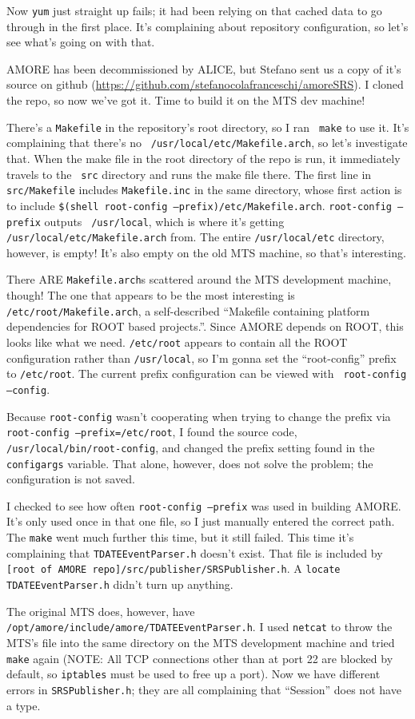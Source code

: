\documentclass[12pt]{article}
\begin{document}
\qq Now {\tt yum} just straight up fails; it had been relying on that cached
data to go through in the first place. It's complaining about repository
configuration, so let's see what's going on with that.

\qq AMORE has been decommissioned by ALICE, but Stefano sent us a copy of it's
source on github (\url{https://github.com/stefanocolafranceschi/amoreSRS}). I
cloned the repo, so now we've got it. Time to build it on the MTS dev machine!

\qq There's a {\tt Makefile} in the repository's root directory, so I ran {\tt
  make} to use it. It's complaining that there's no {\tt
  /usr/local/etc/Makefile.arch}, so let's investigate that. When the make file
in the root directory of the repo is run, it immediately travels to the {\tt
  src} directory and runs the make file there. The first line in {\tt
  src/Makefile} includes {\tt Makefile.inc} in the same directory, whose first
action is to include {\tt \$(shell root-config
  --prefix)/etc/Makefile.arch}. {\tt root-config --prefix} outputs {\tt
  /usr/local}, which is where it's getting {\tt /usr/local/etc/Makefile.arch}
from. The entire {\tt /usr/local/etc} directory, however, is empty! It's also
empty on the old MTS machine, so that's interesting. 

\qq There ARE {\tt Makefile.arch}s scattered around the MTS development machine,
though! The one that appears to be the most interesting is {\tt
  /etc/root/Makefile.arch}, a self-described ``Makefile containing platform
dependencies for ROOT based projects.''. Since AMORE depends on ROOT, this looks
like what we need. {\tt /etc/root} appears to contain all the ROOT configuration
rather than {\tt /usr/local}, so I'm gonna set the ``root-config'' prefix to
{\tt /etc/root}. The current prefix configuration can be viewed with {\tt
  root-config --config}.

\qq Because {\tt root-config} wasn't cooperating when trying to change the
prefix via {\tt root-config --prefix=/etc/root}, I found the source code, {\tt
  /usr/local/bin/root-config}, and changed the prefix setting found in the {\tt
  configargs} variable. That alone, however, does not solve the problem; the
configuration is not saved.

\qq I checked to see how often {\tt root-config --prefix} was used in building
AMORE. It's only used once in that one file, so I just manually entered the
correct path. The {\tt make} went much further this time, but it still
failed. This time it's complaining that {\tt TDATEEventParser.h} doesn't
exist. That file is included by {\tt [root of AMORE
  repo]/src/publisher/SRSPublisher.h}. A {\tt locate TDATEEventParser.h} didn't
turn up anything.  

\qq The original MTS does, however, have {\tt
  /opt/amore/include/amore/TDATEEventParser.h}. I used {\tt netcat} to throw the
MTS's file into the same directory on the MTS development machine and tried {\tt
  make} again (NOTE: All TCP connections other than at port 22 are blocked by
default, so {\tt iptables} must be used to free up a port). Now we have
different errors in {\tt SRSPublisher.h}; they are all complaining that
``Session'' does not have a type.

\end{document}
